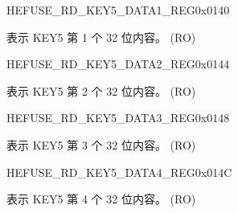\begin{register}{H}{EFUSE\_RD\_KEY5\_DATA1\_REG}{0x0140}\label{regdesc:EFUSERDKEY5DATA1REG}
%
\regnewline%
\begin{regdesc}\begin{reglist}
\label{fielddesc:EFUSEKEY5DATA1}\item [EFUSE\_KEY5\_DATA1] 表示 KEY5 第 1 个 32 位内容。 (RO)
\end{reglist}\end{regdesc}
\end{register}


\begin{register}{H}{EFUSE\_RD\_KEY5\_DATA2\_REG}{0x0144}\label{regdesc:EFUSERDKEY5DATA2REG}
%
\regnewline%
\begin{regdesc}\begin{reglist}
\label{fielddesc:EFUSEKEY5DATA2}\item [EFUSE\_KEY5\_DATA2] 表示 KEY5 第 2 个 32 位内容。 (RO)
\end{reglist}\end{regdesc}
\end{register}


\begin{register}{H}{EFUSE\_RD\_KEY5\_DATA3\_REG}{0x0148}\label{regdesc:EFUSERDKEY5DATA3REG}
%
\regnewline%
\begin{regdesc}\begin{reglist}
\label{fielddesc:EFUSEKEY5DATA3}\item [EFUSE\_KEY5\_DATA3] 表示 KEY5 第 3 个 32 位内容。 (RO)
\end{reglist}\end{regdesc}
\end{register}


\begin{register}{H}{EFUSE\_RD\_KEY5\_DATA4\_REG}{0x014C}\label{regdesc:EFUSERDKEY5DATA4REG}
%
\regnewline%
\begin{regdesc}\begin{reglist}
\label{fielddesc:EFUSEKEY5DATA4}\item [EFUSE\_KEY5\_DATA4] 表示 KEY5 第 4 个 32 位内容。 (RO)
\end{reglist}\end{regdesc}
\end{register}


